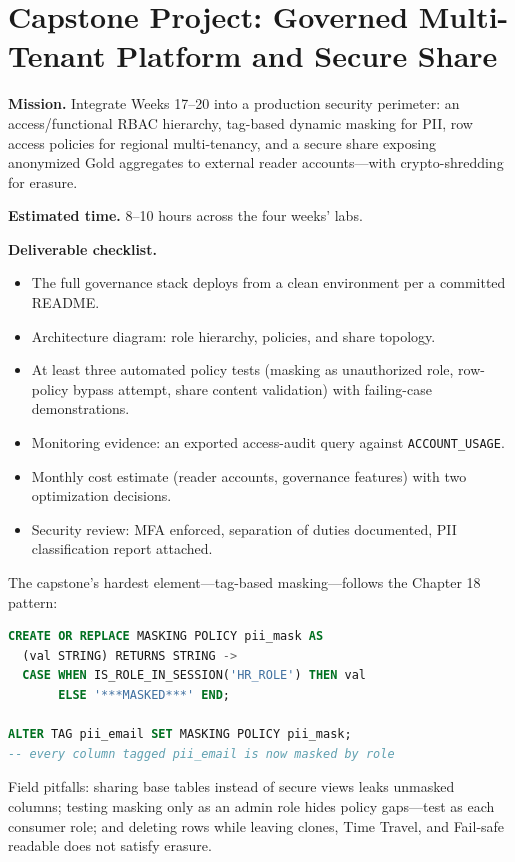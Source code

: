 \section{Capstone Project: Governed Multi-Tenant Platform and Secure Share}\label{sec:ch20-capstone}
\begin{capstonebox}
\textbf{Mission.} Integrate Weeks 17--20 into a production security perimeter: an access/functional RBAC hierarchy, tag-based dynamic masking for PII, row access policies for regional multi-tenancy, and a secure share exposing anonymized Gold aggregates to external reader accounts---with crypto-shredding for erasure.

\textbf{Estimated time.} 8--10 hours across the four weeks' labs.

\textbf{Deliverable checklist.}
\begin{itemize}
    \item The full governance stack deploys from a clean environment per a committed README.
    \item Architecture diagram: role hierarchy, policies, and share topology.
    \item At least three automated policy tests (masking as unauthorized role, row-policy bypass attempt, share content validation) with failing-case demonstrations.
    \item Monitoring evidence: an exported access-audit query against \texttt{ACCOUNT\_USAGE}.
    \item Monthly cost estimate (reader accounts, governance features) with two optimization decisions.
    \item Security review: MFA enforced, separation of duties documented, PII classification report attached.
\end{itemize}
\end{capstonebox}

The capstone's hardest element---tag-based masking---follows the Chapter 18 pattern:

\begin{lstlisting}[language=SQL, caption={Tag-based dynamic masking policy}]
CREATE OR REPLACE MASKING POLICY pii_mask AS
  (val STRING) RETURNS STRING ->
  CASE WHEN IS_ROLE_IN_SESSION('HR_ROLE') THEN val
       ELSE '***MASKED***' END;

ALTER TAG pii_email SET MASKING POLICY pii_mask;
-- every column tagged pii_email is now masked by role
\end{lstlisting}

Field pitfalls: sharing base tables instead of secure views leaks unmasked columns; testing masking only as an admin role hides policy gaps---test as each consumer role; and deleting rows while leaving clones, Time Travel, and Fail-safe readable does not satisfy erasure.
